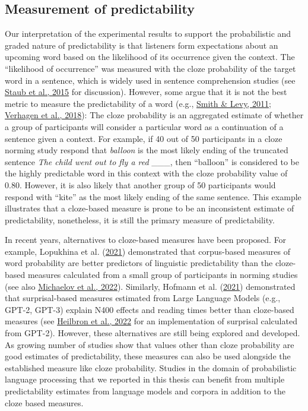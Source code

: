\documentclass[a4paper, nobind]{templates/ociamthesis}
\begin{document}
\hypertarget{measurement-of-predictability}{%
\subsection{Measurement of predictability}\label{measurement-of-predictability}}

Our interpretation of the experimental results to support the probabilistic and graded nature of predictability is that listeners form expectations about an upcoming word based on the likelihood of its occurrence given the context.
The ``likelihood of occurrence'' was measured with the cloze probability of the target word in a sentence,
which is widely used in sentence comprehension studies (see \protect\hyperlink{ref-Staub2015a}{Staub et al., 2015} for discussion).
However, some argue that it is not the best metric to measure the predictability of a word (e.g., \protect\hyperlink{ref-Smith2011}{Smith \& Levy, 2011}; \protect\hyperlink{ref-Verhagen2018}{Verhagen et al., 2018}):
The cloze probability is an aggregated estimate of whether a group of participants will consider a particular word as a continuation of a sentence given a context.
For example, if 40 out of 50 participants in a cloze norming study respond that \emph{balloon} is the most likely ending of the truncated sentence \emph{The child went out to fly a red} \_\_\_,
then ``balloon'' is considered to be the highly predictable word in this context with the cloze probability value of 0.80.
However, it is also likely that another group of 50 participants would respond with ``kite'' as the most likely ending of the same sentence.
This example illustrates that a cloze-based measure is prone to be an inconsistent estimate of predictability,
nonetheless, it is still the primary measure of predictability.

In recent years, alternatives to cloze-based measures have been proposed.
For example, Lopukhina et al. (\protect\hyperlink{ref-Lopukhina2021}{2021}) demonstrated that corpus-based measures of word probability are better predictors of linguistic predictability than the cloze-based measures calculated from a small group of participants in norming studies (see also \protect\hyperlink{ref-Michaelov2022}{Michaelov et al., 2022}).
Similarly, Hofmann et al. (\protect\hyperlink{ref-Hofmann2021}{2021}) demonstrated that surprisal-based measures estimated from Large Language Models (e.g., GPT-2, GPT-3) explain N400 effects and reading times better than cloze-based measures (see \protect\hyperlink{ref-Heilbron2022}{Heilbron et al., 2022} for an implementation of surprisal calculated from GPT-2).
However, these alternatives are still being explored and developed.
As growing number of studies show that values other than cloze probability are good estimates of predictability,
these measures can also be used alongside the established measure like cloze probability.
Studies in the domain of probabilistic language processing that we reported in this thesis can benefit from multiple predictability estimates from language models and corpora in addition to the cloze based measures.
\end{document}
